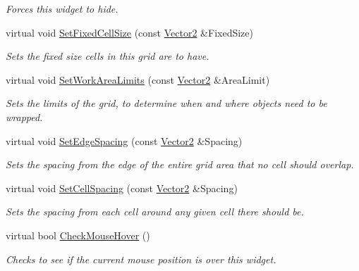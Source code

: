 \begin{DoxyCompactItemize}
\begin{DoxyCompactList}\small\item\em Forces this widget to hide. \item\end{DoxyCompactList}\item 
virtual void \hyperlink{classphys_1_1UI_1_1PagedCellGrid_a0083810bb8c7857ef2b4e2ce40dbaa8d}{SetFixedCellSize} (const \hyperlink{classphys_1_1Vector2}{Vector2} \&FixedSize)
\begin{DoxyCompactList}\small\item\em Sets the fixed size cells in this grid are to have. \item\end{DoxyCompactList}\item 
virtual void \hyperlink{classphys_1_1UI_1_1PagedCellGrid_af50d0b6337d727ac914f1f0c6f15c198}{SetWorkAreaLimits} (const \hyperlink{classphys_1_1Vector2}{Vector2} \&AreaLimit)
\begin{DoxyCompactList}\small\item\em Sets the limits of the grid, to determine when and where objects need to be wrapped. \item\end{DoxyCompactList}\item 
virtual void \hyperlink{classphys_1_1UI_1_1PagedCellGrid_a1bfa7f6ebfc9cec285509f5ddb649f08}{SetEdgeSpacing} (const \hyperlink{classphys_1_1Vector2}{Vector2} \&Spacing)
\begin{DoxyCompactList}\small\item\em Sets the spacing from the edge of the entire grid area that no cell should overlap. \item\end{DoxyCompactList}\item 
virtual void \hyperlink{classphys_1_1UI_1_1PagedCellGrid_ad565437a52149f099c1757903f930723}{SetCellSpacing} (const \hyperlink{classphys_1_1Vector2}{Vector2} \&Spacing)
\begin{DoxyCompactList}\small\item\em Sets the spacing from each cell around any given cell there should be. \item\end{DoxyCompactList}\item 
virtual bool \hyperlink{classphys_1_1UI_1_1PagedCellGrid_a859ed3c174faf86962df4d0fd2b43fab}{CheckMouseHover} ()
\begin{DoxyCompactList}\small\item\em Checks to see if the current mouse position is over this widget. \item\end{DoxyCompactList}\item 

\end{DoxyCompactItemize}

